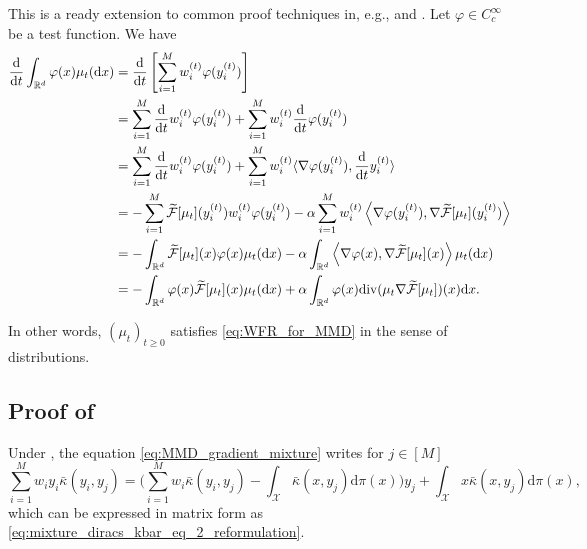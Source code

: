 This is a ready extension to common proof techniques in, e.g., \citep{YaWaRi24} and \citep[Section 5.7.]{ChNiRi24}. Let $\varphi \in C_{c}^{\infty}$ be a test function. We have
\begin{align*}
    \frac{\mathrm{d}}{\mathrm{d}t} \int_{\mathbb{R}^{d}} \varphi(x) \mu_{t}(\mathrm{d}x) & = \frac{\mathrm{d}}{\mathrm{d}t} \left[ \sum\limits_{i = 1}^{M} w_{i}^{(t)}  \varphi(y_{i}^{(t)}) \right] \\
    & = \sum\limits_{i = 1}^{M} \frac{\mathrm{d}}{\mathrm{d}t} w_{i}^{(t)}  \varphi(y_{i}^{(t)}) + \sum\limits_{i = 1}^{M}w_{i}^{(t)} \frac{\mathrm{d}}{\mathrm{d}t} \varphi(y_{i}^{(t)})   \\
    & = \sum\limits_{i = 1}^{M} \frac{\mathrm{d}}{\mathrm{d}t} w_{i}^{(t)}  \varphi(y_{i}^{(t)}) + \sum\limits_{i = 1}^{M}w_{i}^{(t)} \langle \nabla \varphi(y_{i}^{(t)}), \frac{\mathrm{d}}{\mathrm{d}t} y_{i}^{(t)} \rangle    \\
    & = - \sum\limits_{i = 1}^{M} \widetilde{\mathcal{F}}[\mu_t](y_{i}^{(t)}) w_{i}^{(t)}  \varphi(y_{i}^{(t)}) - \alpha\sum\limits_{i = 1}^{M} w_{i}^{(t)} \left\langle \nabla \varphi(y_{i}^{(t)}), \nabla \widetilde{\mathcal{F}}[\mu_t](y_{i}^{(t)}) \right\rangle    \\
    & = -  \int_{\mathbb{R}^{d}} \widetilde{\mathcal{F}}[\mu_t](x) \varphi(x)  \mu_{t}(\mathrm{d}x) -\alpha 
    \int_{
    \mathbb{R}^d} \left\langle \nabla \varphi(x), \nabla \widetilde{\mathcal{F}}[\mu_t](x) \right\rangle \mu_{t}(\mathrm{d}x)\\
    & = -  \int_{\mathbb{R}^{d}} \varphi(x) \widetilde{\mathcal{F}}[\mu_t](x)   \mu_{t}(\mathrm{d}x) + \alpha
    \int_{
    \mathbb{R}^d}  \varphi(x) \mathrm{div}(\mu_t \nabla \widetilde{\mathcal{F}}[\mu_t]  )(x) \mathrm{d}x.
\end{align*}

In other words, $(\mu_{t})_{t\geq 0}$ satisfies \eqref{eq:WFR_for_MMD} in the sense of distributions.



\subsection{Proof of \texorpdfstring{}{Theorem \ref{prop:steady_state_equation_on_y}}}\label{proof:steady_state_equation_on_y}

Under , the equation \eqref{eq:MMD_gradient_mixture} writes for $j \in [M]$
\begin{equation}\label{eq:mixture_diracs_kbar_eq_2}
   \sum\limits_{i=1}^{M} w_{i} y_{i} \bar{\kappa}(y_i,y_j) = \Big(\sum\limits_{i=1}^{M} w_{i}  \bar{\kappa}(y_i,y_j) - \int_{\mathcal{X}} \bar{\kappa}(x,y_j) \mathrm{d}\pi(x) \Big)  y_j +    \int_{\mathcal{X}} x \bar{\kappa}(x,y_j) \mathrm{d}\pi(x),
\end{equation}
which can be expressed in matrix form as \eqref{eq:mixture_diracs_kbar_eq_2_reformulation}.



